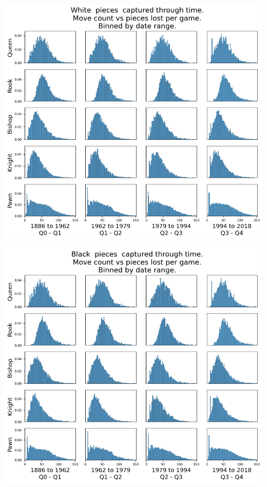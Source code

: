 \documentclass[11pt]{article}
\begin{document}
\begin{center}
\includegraphics[width=\textwidth]{Images/_HIST_Queen_Rook_Bishop_Knight_Pawn_WHITE_DATE_TOURNEMENTS.png}
\end{center}

\begin{center}
\includegraphics[width=\textwidth]{Images/_HIST_Queen_Rook_Bishop_Knight_Pawn_BLACK_DATE_TOURNEMENTS.png}
\end{center}
\end{document}
